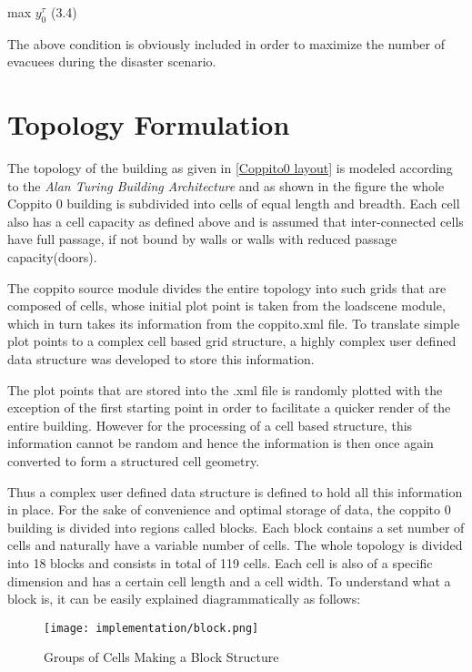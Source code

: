 \hspace{60mm} max $y^\tau_0$    \hspace{60mm} (3.4)

The above condition is obviously included in order to maximize the number of evacuees during the disaster scenario.


\section{Topology Formulation}
\label{sec: Topology Formulation}


The topology of the building as given in \ref{Coppito0 layout} is modeled according to the \textit{Alan Turing Building Architecture} and as shown in the figure the whole Coppito 0 building is subdivided into cells of equal length and breadth. Each cell also has a cell capacity as defined above and is assumed that inter-connected cells have full passage, if not bound by walls or walls with reduced passage capacity(doors). 

The coppito source module divides the entire topology into such grids that are composed of cells, whose initial plot point is taken from the loadscene module, which in turn takes its information from the coppito.xml file. To translate simple plot points to a complex cell based grid structure, a highly complex user defined data structure was developed to store this information. 

The plot points that are stored into the .xml file is randomly plotted with the exception of the first starting point in order to facilitate a quicker render of the entire building. However for the processing of a cell based structure, this information cannot be random and hence the information is then once again converted to form a structured cell geometry.

Thus a complex user defined data structure is defined to hold all this information in place. For the sake of convenience and optimal storage of data, the coppito 0 building is divided into regions called blocks. Each block contains a set number of cells and naturally have a variable number of cells. The whole topology is divided into 18 blocks and consists in total of 119 cells. Each cell is also of a specific dimension and has a certain cell length and a cell width. To understand what a block is, it can be easily explained diagrammatically as follows:

\begin{figure}[H]
  \centering
  \texttt{[image: implementation/block.png]}
  \caption{Groups of Cells Making a Block Structure}
  \label{block}
\end{figure}

